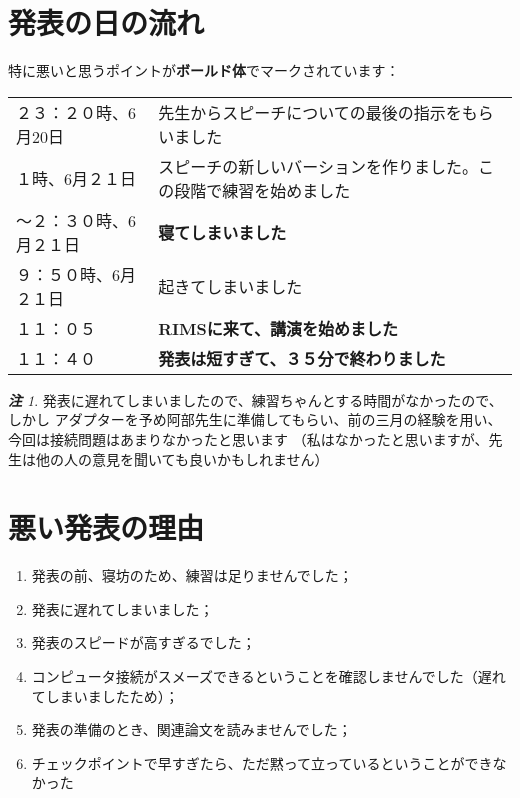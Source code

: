 \documentclass[12pt]{article} %
\theoremstyle{remark}
\newtheorem*{remark*}{\textbf{注}}
\begin{document}
\section{発表の日の流れ}
特に悪いと思うポイントが\textbf{ボールド体}でマークされています：
\begin{center}
	\begin{tabular}[]{lp{}}
		２３：２０時、6月20日&先生からスピーチについての最後の指示をもらいました\\
		１時、6月２１日&スピーチの新しいバーションを作りました。この段階で練習を始めました\\
		〜２：３０時、6月２１日&{\bf 寝てしまいました}\\
		９：５０時、6月２１日&起きてしまいました\\
		１１：０５&{\bf RIMSに来て、講演を始めました}\\
		１１：４０&{\bf 発表は短すぎて、３５分で終わりました}\\
	\end{tabular}
	\begin{remark*}
		発表に遅れてしまいましたので、練習ちゃんとする時間がなかったので、しかし
		アダプターを予め阿部先生に準備してもらい、前の三月の経験を用い、今回は接続問題はあまりなかったと思います
		（私はなかったと思いますが、先生は他の人の意見を聞いても良いかもしれません）
	\end{remark*}
\end{center}
\section{悪い発表の理由}
\begin{enumerate}
	\item 発表の前、寝坊のため、練習は足りませんでした；
	\item 発表に遅れてしまいました；
	\item 発表のスピードが高すぎるでした；
	\item コンピュータ接続がスメーズできるということを確認しませんでした（遅れてしまいましたため）；
	\item 発表の準備のとき、関連論文を読みませんでした；
	\item チェックポイントで早すぎたら、ただ黙って立っているということができなかった
\end{enumerate}
\end{document}
